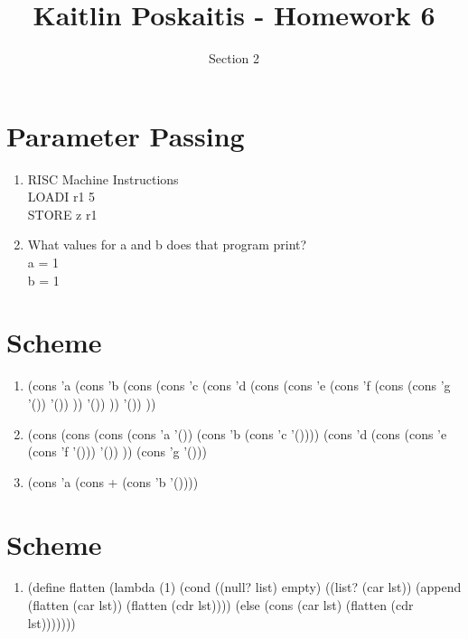 \documentclass[11pt]{article}
\title{\bf Kaitlin Poskaitis - Homework 6}
\author{Section 2}
\date{}
\begin{document}
\maketitle

\section{Parameter Passing}
\begin{enumerate}
	\item RISC Machine Instructions \\
	LOADI r1 5\\
	STORE z r1
	\item What values for a and b does that program print?\\
	a = 1\\
	b = 1


\end{enumerate}

\section{Scheme}

\begin{enumerate}
	\item 
	(cons 'a (cons 'b 
		(cons (cons 'c (cons 'd 
			(cons (cons 'e (cons 'f 
				(cons (cons 'g '()) '())
			)) '())
		)) '()) 
	))
	\item
	(cons
		(cons 
			(cons 
				(cons 'a '())
			(cons 'b (cons 'c '())))
		(cons 'd 
			(cons (cons 'e (cons 'f '())) '())	
		))
	(cons 'g '()))
	\item
	(cons 'a (cons + (cons 'b '())))

\end{enumerate}

\section{Scheme}

\begin{enumerate}
	\item
	(define flatten
	 (lambda (1)
	  (cond 
	   ((null? list)
		empty)
	   ((list? (car lst))
		(append (flatten (car lst)) (flatten (cdr lst))))
	   (else
		(cons (car lst) (flatten (cdr lst)))))))


\end{enumerate}
\end{document}
